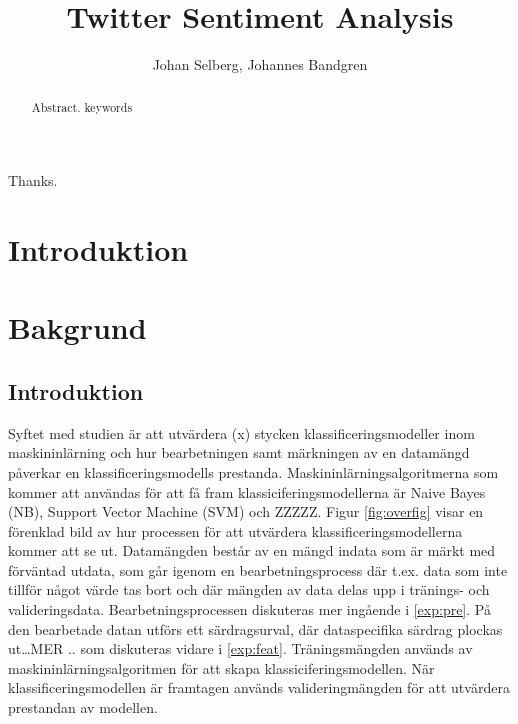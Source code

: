 \documentclass{kaumasters} %
\title{Twitter Sentiment Analysis}
\author{Johan Selberg, Johannes Bandgren}
\institute{Department of Computer Science}
\begin{document}
\maketitle




\frontmatter
\begin{abstract}
  Abstract.
  \keywords keywords
\end{abstract}
\approvalpage%
\begin{acknowledgements}
  Thanks.
\end{acknowledgements}

\tableofcontents{}
\listoffigures
\listoftables
\mainmatter
\pagestyle{fancy}
\fancyhead[LE,RO]{\thepage}
\fancyhead[RE,LO]{\rightmark}
\fancyfoot{}
\chapter{Introduktion}

\newpage


\chapter{Bakgrund}
\section{Introduktion} \label{bac:intro}
Syftet med studien är att utvärdera (x) stycken klassificeringsmodeller inom maskininlärning och hur bearbetningen samt märkningen av en datamängd påverkar en klassificeringsmodells prestanda. Maskininlärningsalgoritmerna som kommer att användas för att få fram klassiciferingsmodellerna är Naive Bayes (NB), Support Vector Machine (SVM) och ZZZZZ. Figur \ref{fig:overfig} visar en förenklad bild av hur processen för att utvärdera klassificeringsmodellerna kommer att se ut. Datamängden består av en mängd indata som är märkt med förväntad utdata, som går igenom en bearbetningsprocess där t.ex. data som inte tillför något värde tas bort och där mängden av data delas upp i tränings- och valideringsdata.  Bearbetningsprocessen diskuteras mer ingående i \ref{exp:pre}. På den bearbetade datan utförs ett särdragsurval, där dataspecifika särdrag plockas ut…MER .. som diskuteras vidare i \ref{exp:feat}. Träningsmängden används av maskininlärningsalgoritmen för att skapa klassiciferingsmodellen. När klassificeringsmodellen är framtagen används valideringmängden för att utvärdera prestandan av modellen.
\end{document}
